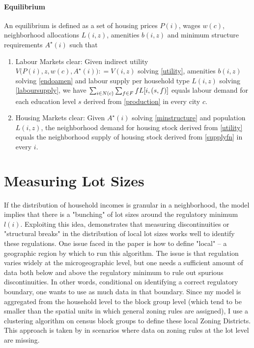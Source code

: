 \documentclass[]{article}
\begin{document}
 
 \paragraph*{Equilibrium} An equilibrium is defined as a set of housing prices $P(i)$, wages $w(c)$, neighborhood allocations $L(i, z)$, amenities $b(i, z)$ and minimum structure requirements $A^{\star}(i)$ such that 
 \begin{enumerate}
 	\item Labour Markets clear: Given indirect utility $V\big(P(i), z, w(c), A^{\star}(i)\big) : = V(i, z)$ solving \eqref{utility}, amenities $b(i, z)$ solving \eqref{endoamen} and labour supply per household type $L(i, z)$ solving \eqref{laboursupply}, we have $\sum_{i \in N(c)}\sum_{f \in F}fL[i, \small(s, f\small)]$ equals labour demand for each education level $s$ derived from \eqref{production} in every city $c$.
 	
 	\item Housing Markets clear: Given $A^{\star}(i)$ solving \eqref{minstructure} and population $L(i, z)$, the neighborhood demand for housing stock derived from \eqref{utility} equals the neighborhood supply of housing stock derived from \eqref{supplyfn} in every $i$. 
 \end{enumerate}




\section{Measuring Lot Sizes}\label{section:LotSizeMeasure}
\paragraph*{}
 If the distribution of household incomes is granular in a neighborhood, the model implies that there is a "bunching" of lot sizes around the regulatory minimum $l(i)$. Exploiting this idea, \cite{Song} demonstrates that measuring discontinuities or "structural breaks" in the distribution of local lot sizes works well to identify these regulations. One issue faced in the paper is how to define "local" -- a geographic region by which to run this algorithm. The issue is that regulation varies widely at the microgeographic level, but one needs a sufficient amount of data both below and above the regulatory minimum to rule out spurious discontinuities. In other words, conditional on identifying a correct regulatory boundary, one wants to use as much data in that boundary. Since my model is aggregated from the household level to the block group level (which tend to be smaller than the spatial units in which general zoning rules are assigned), I use a clustering algorithm on census block groups to define these local Zoning Districts. This approach is taken by \cite{Song} in scenarios where data on zoning rules at the lot level are missing. 
\end{document}
